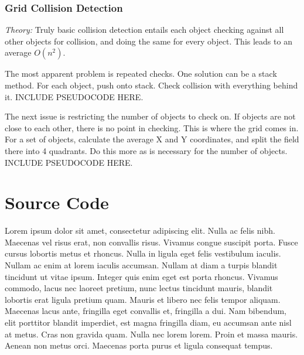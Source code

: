\documentclass[12pt]{article}
\begin{document}
    \subsubsection{Grid Collision Detection}
      \emph{Theory: } Truly basic collision detection entails each object checking against all other objects for collision, and doing the same for every object. This leads to an average $O(n^2)$.

      The most apparent problem is repeated checks. One solution can be a stack method. For each object, push onto stack. Check collision with everything behind it. INCLUDE PSEUDOCODE HERE.

      The next issue is restricting the number of objects to check on. If objects are not close to each other, there is no point in checking. This is where the grid comes in. For a set of objects, calculate the average X and Y coordinates, and split the field there into 4 quadrants. Do this more as is necessary for the number of objects. INCLUDE PSEUDOCODE HERE.

  \section{Source Code}
    Lorem ipsum dolor sit amet, consectetur adipiscing elit. Nulla ac felis nibh. Maecenas vel risus erat, non convallis risus. Vivamus congue suscipit porta. Fusce cursus lobortis metus et rhoncus. Nulla in ligula eget felis vestibulum iaculis. Nullam ac enim at lorem iaculis accumsan. Nullam at diam a turpis blandit tincidunt ut vitae ipsum. Integer quis enim eget est porta rhoncus. Vivamus commodo, lacus nec laoreet pretium, nunc lectus tincidunt mauris, blandit lobortis erat ligula pretium quam. Mauris et libero nec felis tempor aliquam. Maecenas lacus ante, fringilla eget convallis et, fringilla a dui. Nam bibendum, elit porttitor blandit imperdiet, est magna fringilla diam, eu accumsan ante nisl at metus. Cras non gravida quam. Nulla nec lorem lorem. Proin et massa mauris. Aenean non metus orci. Maecenas porta purus et ligula consequat tempus.
\end{document}
